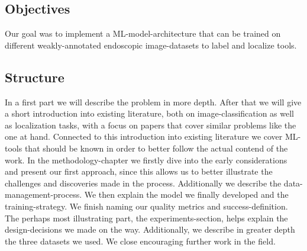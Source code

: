 \subsection{Objectives}

Our goal was to implement a ML-model-architecture that can be trained on different weakly-annotated endoscopic image-datasets to label and localize tools. 

\subsection{Structure}
In a first part we will describe the problem in more depth. After that we will give a short introduction into existing literature, both on image-classification as well as localization tasks, with a focus on papers that cover similar problems like the one at hand. Connected to this introduction into existing literature we cover ML-tools that should be known in order to better follow the actual contend of the work. 
In the methodology-chapter we firstly dive into the early considerations and present our first approach, since this allows us to better illustrate the challenges and discoveries made in the process. Additionally we describe the data-management-process.
We then explain the model we finally developed and the training-strategy. We finish naming our quality metrics and success-definition.
The perhaps most illustrating part, the experiments-section, helps explain the design-decisions we made on the way. Additionally, we describe in greater depth the three datasets we used. We close encouraging further work in the field.